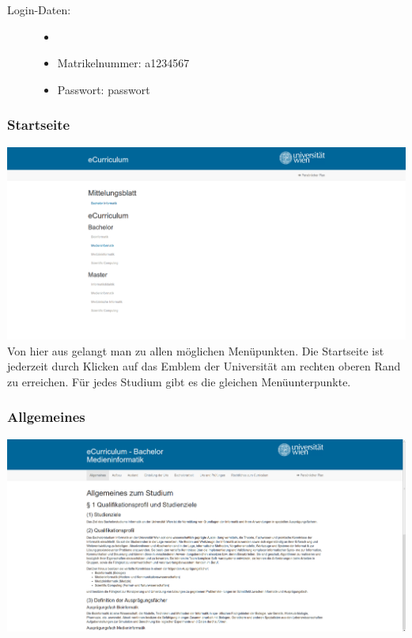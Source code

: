 \documentclass[a4paper,10pt]{scrartcl}
\begin{document}
\begin{description}
 \item[Login-Daten:] 
 \begin{itemize}
  \item[]
  \item Matrikelnummer: a1234567
  \item Passwort: passwort
 \end{itemize}

\end{description}

\subsubsection{Startseite}

\includegraphics[scale=0.19]{./hifi_screenshots/hifi_startseite.png}\\

Von hier aus gelangt man zu allen möglichen Menüpunkten. Die Startseite ist jederzeit durch Klicken auf das Emblem der Universität am rechten oberen Rand zu erreichen. Für jedes Studium gibt es die gleichen Menüunterpunkte.

\subsubsection{Allgemeines}

\includegraphics[scale=0.19]{./hifi_screenshots/hifi_allgemeines.png}\\
\end{document}
